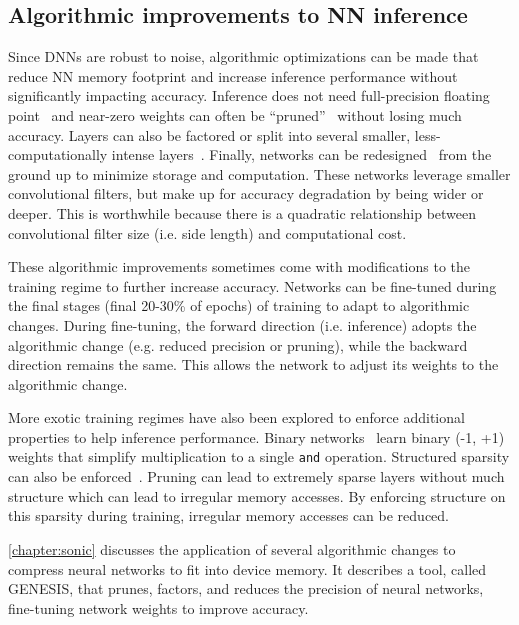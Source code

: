 \subsection{Algorithmic improvements to NN inference}
\label{chapter:background:inference:algorithm}
Since DNNs are robust to noise, algorithmic optimizations can be made that reduce NN memory footprint and increase inference performance without significantly impacting accuracy.
% 
Inference does not need full-precision floating point~\cite{han:isca16:eie,desa:isca17:sgd} and near-zero weights can often be ``pruned''~\cite{nabhan1994toward, han:iclr16:deep-compression,nakkiran:interspeech15:compressing,bhattacharya2016sparsification} without losing much accuracy.
% 
Layers can also be factored or split into several smaller, less-computationally intense layers~\cite{szegedy2017inception,szegedy2016rethinking,chollet2016xception}.
% 
Finally, networks can be redesigned~\cite{iandola:arxiv16:squeezenet,tan2019efficientnet,sandler2018mobilenetv2} from the ground up to minimize storage and computation.
% 
These networks leverage smaller convolutional filters, but make up for accuracy degradation by being wider or deeper.
% 
This is worthwhile because there is a quadratic relationship between convolutional filter size (i.e. side length) and computational cost.

These algorithmic improvements sometimes come with modifications to the training regime to further increase accuracy.
% 
Networks can be fine-tuned during the final stages (final 20-30\% of epochs) of training to adapt to algorithmic changes.
% 
During fine-tuning, the forward direction (i.e. inference) adopts the algorithmic change (e.g. reduced precision or pruning), while the backward direction remains the same.
% 
This allows the network to adjust its weights to the algorithmic change.

More exotic training regimes have also been explored to enforce additional properties to help inference performance.
% 
Binary networks~\cite{lin2018binary} learn binary (-1, +1) weights that simplify multiplication to a single {\tt and} operation.
% 
Structured sparsity can also be enforced~\cite{deng2018permdnn,nakkiran:interspeech15:compressing}.
% 
Pruning can lead to extremely sparse layers without much structure which can lead to irregular memory accesses.
% 
By enforcing structure on this sparsity during training, irregular memory accesses can be reduced.

\autoref{chapter:sonic} discusses the application of several algorithmic changes to compress neural networks to fit into device memory.
%
It describes a tool, called GENESIS, that prunes, factors, and reduces the precision of neural networks, fine-tuning network weights to improve accuracy.

